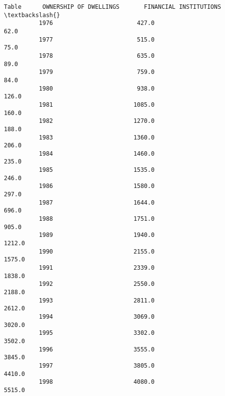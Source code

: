 \documentclass[11pt]{article}
\begin{document}
\begin{Verbatim}[commandchars=\\\{\}]
          Table      OWNERSHIP OF DWELLINGS       FINANCIAL INSTITUTIONS   \textbackslash{}
          1976                        427.0                          62.0   
          1977                        515.0                          75.0   
          1978                        635.0                          89.0   
          1979                        759.0                          84.0   
          1980                        938.0                         126.0   
          1981                       1085.0                         160.0   
          1982                       1270.0                         188.0   
          1983                       1360.0                         206.0   
          1984                       1460.0                         235.0   
          1985                       1535.0                         246.0   
          1986                       1580.0                         297.0   
          1987                       1644.0                         696.0   
          1988                       1751.0                         905.0   
          1989                       1940.0                        1212.0   
          1990                       2155.0                        1575.0   
          1991                       2339.0                        1838.0   
          1992                       2550.0                        2188.0   
          1993                       2811.0                        2612.0   
          1994                       3069.0                        3020.0   
          1995                       3302.0                        3502.0   
          1996                       3555.0                        3845.0   
          1997                       3805.0                        4410.0   
          1998                       4080.0                        5515.0   
          

\end{Verbatim}
\end{document}
